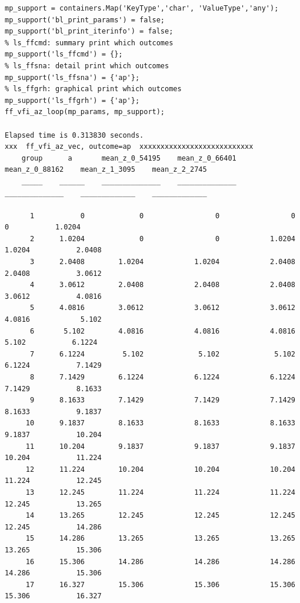 \documentclass[
]{book}
\begin{document}
\begin{verbatim}
mp_support = containers.Map('KeyType','char', 'ValueType','any');
mp_support('bl_print_params') = false;
mp_support('bl_print_iterinfo') = false;
% ls_ffcmd: summary print which outcomes
mp_support('ls_ffcmd') = {};
% ls_ffsna: detail print which outcomes
mp_support('ls_ffsna') = {'ap'};
% ls_ffgrh: graphical print which outcomes
mp_support('ls_ffgrh') = {'ap'};
ff_vfi_az_loop(mp_params, mp_support);

Elapsed time is 0.313830 seconds.
xxx  ff_vfi_az_vec, outcome=ap  xxxxxxxxxxxxxxxxxxxxxxxxxxx
    group      a       mean_z_0_54195    mean_z_0_66401    mean_z_0_88162    mean_z_1_3095    mean_z_2_2745
    _____    ______    ______________    ______________    ______________    _____________    _____________

      1           0             0                 0                 0                0           1.0204    
      2      1.0204             0                 0            1.0204           1.0204           2.0408    
      3      2.0408        1.0204            1.0204            2.0408           2.0408           3.0612    
      4      3.0612        2.0408            2.0408            2.0408           3.0612           4.0816    
      5      4.0816        3.0612            3.0612            3.0612           4.0816            5.102    
      6       5.102        4.0816            4.0816            4.0816            5.102           6.1224    
      7      6.1224         5.102             5.102             5.102           6.1224           7.1429    
      8      7.1429        6.1224            6.1224            6.1224           7.1429           8.1633    
      9      8.1633        7.1429            7.1429            7.1429           8.1633           9.1837    
     10      9.1837        8.1633            8.1633            8.1633           9.1837           10.204    
     11      10.204        9.1837            9.1837            9.1837           10.204           11.224    
     12      11.224        10.204            10.204            10.204           11.224           12.245    
     13      12.245        11.224            11.224            11.224           12.245           13.265    
     14      13.265        12.245            12.245            12.245           12.245           14.286    
     15      14.286        13.265            13.265            13.265           13.265           15.306    
     16      15.306        14.286            14.286            14.286           14.286           15.306    
     17      16.327        15.306            15.306            15.306           15.306           16.327    

\end{verbatim}
\end{document}
